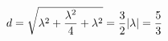 \documentclass[preview]{standalone}
\begin{document}
\begin{align*}
\special{dvisvgm:raw <g id='unique000'>}d=\sqrt{\lambda^2+\dfrac{\lambda^2}{4}+\lambda^2}=\dfrac{3}{2}|\lambda|=\dfrac{5}{3}\special{dvisvgm:raw </g>}
\end{align*}
\end{document}

